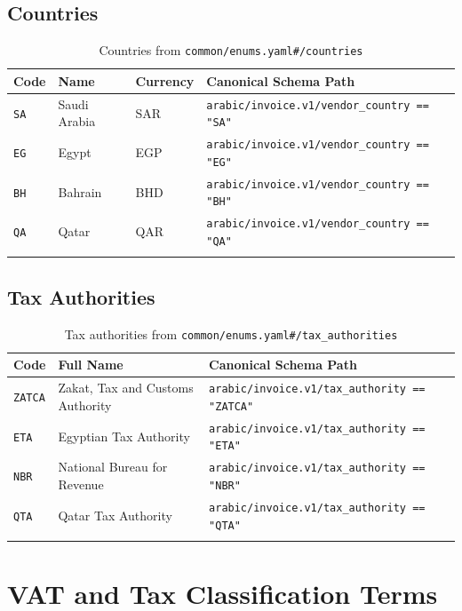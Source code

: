 \documentclass[11pt,a4paper]{report}
\newcommand{\schemapath}[1]{\texttt{\textcolor{pathcolor}{#1}}}
\newcommand{\enumval}[1]{\texttt{\textcolor{sapgreen}{#1}}}
\begin{document}
\section{Countries}

\begin{longtable}{@{}p{1.5cm}p{2.5cm}p{2cm}p{6cm}@{}}
\toprule
\textbf{Code} & \textbf{Name} & \textbf{Currency} & \textbf{Canonical Schema Path} \\
\midrule
\endhead
\enumval{SA} & Saudi Arabia & SAR & \schemapath{arabic/invoice.v1/vendor\_country == "SA"} \\
\enumval{EG} & Egypt & EGP & \schemapath{arabic/invoice.v1/vendor\_country == "EG"} \\
\enumval{BH} & Bahrain & BHD & \schemapath{arabic/invoice.v1/vendor\_country == "BH"} \\
\enumval{QA} & Qatar & QAR & \schemapath{arabic/invoice.v1/vendor\_country == "QA"} \\
\bottomrule
\caption{Countries from \schemapath{common/enums.yaml\#/countries}}
\end{longtable}

\section{Tax Authorities}

\begin{longtable}{@{}p{2cm}p{5cm}p{5cm}@{}}
\toprule
\textbf{Code} & \textbf{Full Name} & \textbf{Canonical Schema Path} \\
\midrule
\endhead
\enumval{ZATCA} & Zakat, Tax and Customs Authority & \schemapath{arabic/invoice.v1/tax\_authority == "ZATCA"} \\
\enumval{ETA} & Egyptian Tax Authority & \schemapath{arabic/invoice.v1/tax\_authority == "ETA"} \\
\enumval{NBR} & National Bureau for Revenue & \schemapath{arabic/invoice.v1/tax\_authority == "NBR"} \\
\enumval{QTA} & Qatar Tax Authority & \schemapath{arabic/invoice.v1/tax\_authority == "QTA"} \\
\bottomrule
\caption{Tax authorities from \schemapath{common/enums.yaml\#/tax\_authorities}}
\end{longtable}

\chapter{VAT and Tax Classification Terms}
\end{document}
